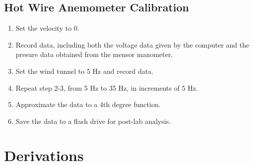 \subsection{Hot Wire Anemometer Calibration}

\begin{enumerate}
\item Set the velocity to 0. \item Record data, including both the voltage data given by the computer and the presure data obtained from the mensor manometer.
\item Set the wind tunnel to 5 Hz and record data. 
\item Repeat step 2-3, from 5 Hz to 35 Hz, in increments of 5 Hz. 
\item Approximate the data to a 4th degree function. 
\item Save the data to a flash drive for post-lab analysis.
\end{enumerate}

\newpage
\section{Derivations}

